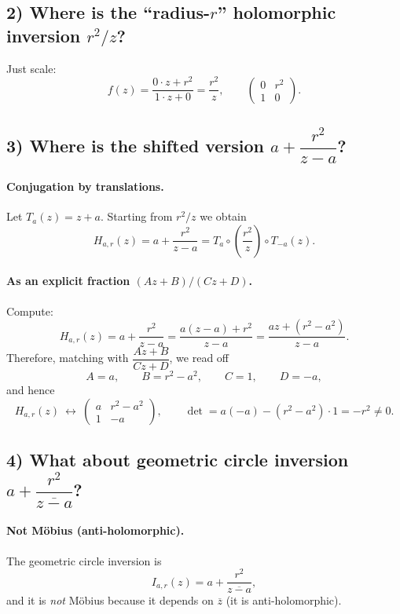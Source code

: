\documentclass[12pt,a4paper]{article}
\theoremstyle{plain}
\theoremstyle{definition}      %
\begin{document}
	\subsection*{\textbf{2) Where is the “radius-$r$” holomorphic inversion $r^{2}/z$?}}
	Just scale:
	\[
	f(z)=\frac{0\cdot z+r^{2}}{1\cdot z+0}=\frac{r^{2}}{z},
	\qquad
	\begin{pmatrix}0 & r^{2}\\ 1 & 0\end{pmatrix}.
	\]
	
	\subsection*{\textbf{3) Where is the shifted version $a+\dfrac{r^{2}}{z-a}$?}}
	
	\paragraph{\textbf{Conjugation by translations.}}
	Let $T_a(z)=z+a$. Starting from $r^{2}/z$ we obtain
	\[
	H_{a,r}(z)=a+\frac{r^{2}}{z-a}
	= T_a\circ\left(\frac{r^{2}}{z}\right)\circ T_{-a}(z).
	\]
	
	\paragraph{\textbf{As an explicit fraction $(Az+B)/(Cz+D)$.}}
	Compute:
	\[
	H_{a,r}(z)=a+\frac{r^{2}}{z-a}
	=\frac{a(z-a)+r^{2}}{z-a}
	=\frac{az+(r^{2}-a^{2})}{z-a}.
	\]
	Therefore, matching with $\dfrac{Az+B}{Cz+D}$, we read off
	\[
	A=a,\qquad B=r^{2}-a^{2},\qquad C=1,\qquad D=-a,
	\]
	and hence
	\[
	H_{a,r}(z)\ \longleftrightarrow\
	\begin{pmatrix}
		a & r^{2}-a^{2}\\[2pt]
		1 & -a
	\end{pmatrix},
	\qquad
	\det=
	a(-a)-(r^{2}-a^{2})\cdot 1=-r^{2}\neq 0.
	\]
	
	\subsection*{\textbf{4) What about geometric circle inversion $a+\dfrac{r^{2}}{\overline{z-a}}$?}}
	
	\paragraph{\textbf{Not Möbius (anti-holomorphic).}}
	The geometric circle inversion is
	\[
	I_{a,r}(z)=a+\frac{r^{2}}{\overline{z-a}},
	\]
	and it is \emph{not} Möbius because it depends on $\overline{z}$ (it is anti-holomorphic).
	
\end{document}
